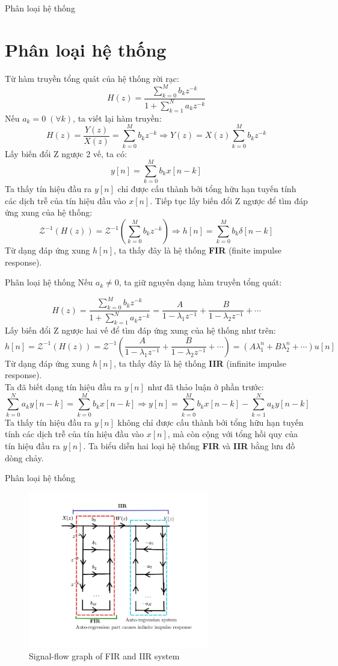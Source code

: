 \documentclass[8pt]{beamer}
\begin{document}
\begin{frame}{Phân loại hệ thống}
\section{Phân loại hệ thống}
Từ hàm truyền tổng quát của hệ thống rời rạc:
$$H(z)=\frac{\sum_{k=0}^{M}b_{k}z^{-k}}{1+\sum_{k=1}^{N}a_{k}z^{-k}}$$
Nếu $a_{k}=0\; (\forall k)$, ta viết lại hàm truyền: $$H(z)=\frac{Y(z)}{X(z)}=\sum_{k=0}^{M}b_{k}z^{-k}\Rightarrow Y(z)=X(z)\sum_{k=0}^{M}b_{k}z^{-k}$$
Lấy biến đổi Z ngược 2 vế, ta có:
$$y[n]=\sum_{k=0}^{M}b_{k}x[n-k]$$
Ta thấy tín hiệu đầu ra $y[n]$ chỉ được cấu thành bởi tổng \alert{hữu hạn} tuyến tính các dịch trễ của tín hiệu đầu vào $x[n]$. Tiếp tục lấy biến đổi Z ngược để tìm đáp ứng xung của hệ thống:
$$\mathscr{Z}^{-1}(H(z))=\mathscr{Z}^{-1}\left(\sum_{k=0}^{M}b_{k}z^{-k}\right)\Rightarrow h[n]=\sum_{k=0}^{M}b_{k}\delta[n-k]$$
Từ dạng đáp ứng xung $h[n]$, ta thấy đây là hệ thống \textbf{FIR} (finite impulse response).
\end{frame}
\begin{frame}{Phân loại hệ thống}
Nếu $a_{k}\neq 0$, ta giữ nguyên dạng hàm truyền tổng quát:

$$H(z)=\frac{\sum_{k=0}^{M}b_{k}z^{-k}}{1+\sum_{k=1}^{N}a_{k}z^{-k}}=\frac{A}{1-\lambda_{1}z^{-1}}+\frac{B}{1-\lambda_{2}z^{-1}}+\cdots$$
Lấy biến đổi Z ngược hai vế để tìm đáp ứng xung của hệ thống như trên:
$$h[n]=\mathscr{Z}^{-1}(H(z))=\mathscr{Z}^{-1}\left(\frac{A}{1-\lambda_{1}z^{-1}}+\frac{B}{1-\lambda_{2}z^{-1}}+\cdots\right)=(A\lambda_{1}^{n}+B\lambda_{2}^{n}+\cdots)u[n]$$
Từ dạng đáp ứng xung $h[n]$, ta thấy đây là hệ thống \textbf{IIR} (infinite impulse response).
\\ Ta đã biết dạng tín hiệu đầu ra $y[n]$ như đã thảo luận ở phần trước:
$$\sum_{k=0}^{N}a_{k}y[n-k]=\sum_{k=0}^{M}b_{k}x[n-k]\Rightarrow y[n]=\sum_{k=0}^{M}b_{k}x[n-k]-\sum_{k=1}^{N}a_{k}y[n-k]$$
Ta thấy tín hiệu đầu ra $y[n]$ không chỉ được cấu thành bởi tổng hữu hạn tuyến tính các dịch trễ  của tín hiệu đầu vào $x[n]$, mà còn cộng với tổng \alert{hồi quy của tín hiệu đầu ra $y[n]$}. Ta biểu diễn hai loại hệ thống \textbf{FIR} và \textbf{IIR} bằng lưu đồ dòng chảy.
\end{frame}
\begin{frame}{Phân loại hệ thống}
\begin{figure}[h]
			\includegraphics[width=0.7\textwidth]{7.jpg}
			\caption{Signal-flow graph of FIR and IIR system}			\label{fig:re7}

		\end{figure}
\end{frame}
\end{document}
